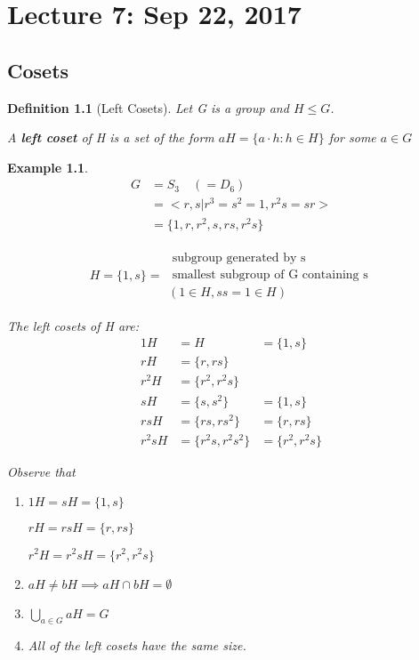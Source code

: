\documentclass[11pt, oneside]{book}
\theoremstyle{break}
\newtheorem{defn}{Definition}[section]
\newtheorem{eg}{Example}[section]
\begin{document}
\chapter{Lecture 7: Sep 22, 2017}\label{chp:lec7}

\section{Cosets}\label{sect:cosets}

\begin{defn}[Left Cosets]
    Let G is a group and $H \leq G$.

    A \textbf{left coset} of H is a set of the form $aH = \{a \cdot h : h \in H\}$ for some $a \in G$
\end{defn}

\begin{eg}
    \begin{align*}
        G &= S_3 \quad (= D_6) \\
          &= <r, s | r^3 = s^2 = 1, r^2s = sr > \\
          &= \{1, r, r^2, s, rs, r^2 s\}
    \end{align*}

    \begin{align*}
        H = \{1, s\} = \substack{\text{ subgroup generated by s} \\ \text{ smallest subgroup of G containing s} \\ (1 \in H, ss = 1 \in H)}
    \end{align*}

    The left cosets of H are:
    \begin{align*}
        1H   &= H    &= \{1, s\} \\
        rH   &= \{r, rs\} &\\
        r^2 H &= \{r^2, r^2s\} &\\
        sH   &= \{s, s^2\}   &= \{1, s\} \\
        rsH  &= \{rs, rs^2\} &= \{r, rs\} \\
        r^2 sH  &= \{r^2s, r^2s^2\} &= \{r^2, r^2s\}
    \end{align*}

    Observe that
    \begin{enumerate}
        \item $1H = sH = \{1, s\}$

            $rH = rsH = \{r, rs\}$

            $r^2H = r^2sH = \{r^2, r^2s\}$
        \item $aH \neq bH \implies aH \cap bH = \emptyset$
        \item $\bigcup_{a \in G} aH = G$
        \item All of the left cosets have the same size.
    \end{enumerate}
\end{eg}
\end{document}
